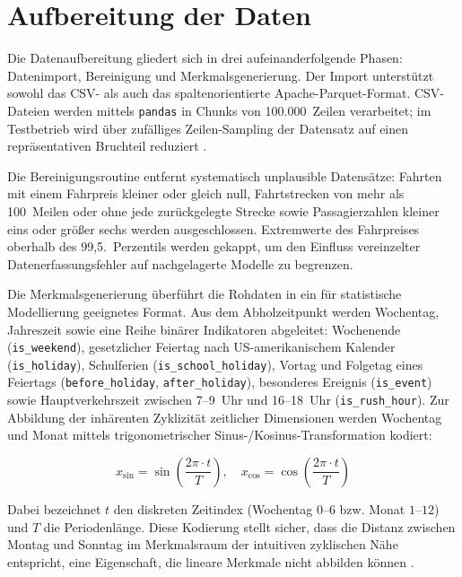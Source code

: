 \section{Aufbereitung der Daten}

Die Datenaufbereitung gliedert sich in drei aufeinanderfolgende Phasen: Datenimport, Bereinigung und Merkmalsgenerierung. Der Import unterstützt sowohl das CSV- als auch das spaltenorientierte Apache-Parquet-Format. CSV-Dateien werden mittels \texttt{pandas} in Chunks von 100.000~Zeilen verarbeitet; im Testbetrieb wird über zufälliges Zeilen-Sampling der Datensatz auf einen repräsentativen Bruchteil reduziert \parencite[vgl.][S.~101~ff.]{VanderPlas.2016}.

Die Bereinigungsroutine entfernt systematisch unplausible Datensätze: Fahrten mit einem Fahrpreis kleiner oder gleich null, Fahrtstrecken von mehr als 100~Meilen oder ohne jede zurückgelegte Strecke sowie Passagierzahlen kleiner eins oder größer sechs werden ausgeschlossen. Extremwerte des Fahrpreises oberhalb des 99{,}5.~Perzentils werden gekappt, um den Einfluss vereinzelter Datenerfassungsfehler auf nachgelagerte Modelle zu begrenzen.

Die Merkmalsgenerierung überführt die Rohdaten in ein für statistische Modellierung geeignetes Format. Aus dem Abholzeitpunkt werden Wochentag, Jahreszeit sowie eine Reihe binärer Indikatoren abgeleitet: Wochenende (\texttt{is\_weekend}), gesetzlicher Feiertag nach US-amerikanischem Kalender (\texttt{is\_holiday}), Schulferien (\texttt{is\_school\_holiday}), Vortag und Folgetag eines Feiertags (\texttt{before\_holiday}, \texttt{after\_holiday}), besonderes Ereignis (\texttt{is\_event}) sowie Hauptverkehrszeit zwischen 7--9~Uhr und 16--18~Uhr (\texttt{is\_rush\_hour}). Zur Abbildung der inhärenten Zyklizität zeitlicher Dimensionen werden Wochentag und Monat mittels trigonometrischer Sinus-/Kosinus-Transformation kodiert:

\begin{equation}
    x_{\sin} = \sin\!\left(\frac{2\pi \cdot t}{T}\right), \quad x_{\cos} = \cos\!\left(\frac{2\pi \cdot t}{T}\right)
\end{equation}

Dabei bezeichnet $t$ den diskreten Zeitindex (Wochentag $0$--$6$ bzw. Monat $1$--$12$) und $T$ die Periodenlänge. Diese Kodierung stellt sicher, dass die Distanz zwischen Montag und Sonntag im Merkmalsraum der intuitiven zyklischen Nähe entspricht, eine Eigenschaft, die lineare Merkmale nicht abbilden können \parencite[vgl.][S.~10~f.]{Fahrmeir.2001}.

